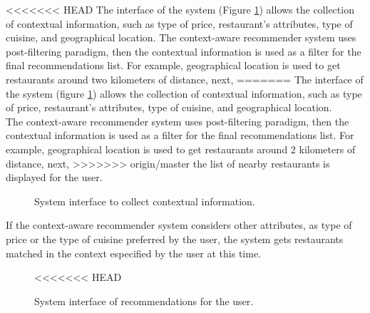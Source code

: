 <<<<<<< HEAD
The interface of the system (Figure  \ref{fig:context}) allows the collection 
of contextual information, such as type of price, restaurant's
attributes, type of cuisine, and geographical location. 
The context-aware recommender system uses post-filtering paradigm, 
then the contextual information is used as a filter for the final 
recommendations list. For example, geographical location is used 
to get restaurants around two kilometers of distance, next, 
=======
The interface of the system (figure \ref{fig:context}) allows the collection 
of contextual information, such as type of price, restaurant's
attributes, type of cuisine, and geographical location. \\ 
The context-aware recommender system uses post-filtering paradigm, 
then the contextual information is used as a filter for the final 
recommendations list. For example, geographical location is used 
to get restaurants around 2 kilometers of distance, next, 
>>>>>>> origin/master
the list of nearby restaurants is displayed for the user.\\  
\begin{figure}
\captionsetup{justification=centering,margin=2cm,font=footnotesize}
\centering
{}
\caption{System interface to collect contextual information.}
\label{fig:context}   
\end{figure}
If the context-aware recommender system
considers other attributes, as type of price or the type of cuisine
preferred by the user, the system gets restaurants matched in the
context especified by the user at this time. 
\begin{figure}
\captionsetup{font=footnotesize}
\centering
{}
<<<<<<< HEAD
\caption{System interface of recommendations for the user.}
\label{fig:recom}    
\end{figure}
